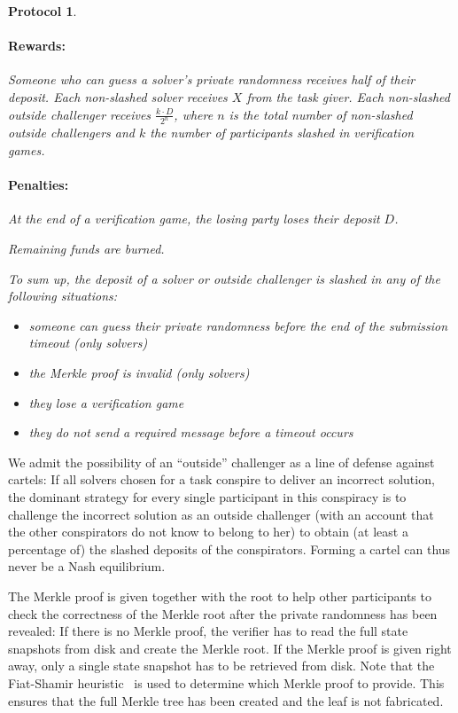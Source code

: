 \documentclass[a4paper]{article}
\newtheorem{protocol}[dummy]{Protocol}
\begin{document}
\begin{protocol}
\paragraph{Rewards:}
Someone who can guess a solver's private randomness receives half of their deposit.
Each non-slashed solver receives $X$ from the task giver.
Each non-slashed outside challenger receives $\frac{k\cdot D}{2^n}$, where
$n$ is the total number of non-slashed outside challengers and $k$ the number of
participants slashed in verification games.

\paragraph{Penalties:}
At the end of a verification game, the losing party loses their deposit $D$.

Remaining funds are burned.

To sum up, the deposit of a solver or outside challenger is slashed in any of the following situations:
\begin{itemize}
\item someone can guess their private randomness before the end of the submission timeout (only solvers)
\item the Merkle proof is invalid (only solvers)
\item they lose a verification game
\item they do not send a required message before a timeout occurs
\end{itemize}
\end{protocol}

We admit the possibility of an ``outside'' challenger
as a line of defense against cartels: If all solvers chosen for a task
conspire to deliver an incorrect solution, the dominant strategy for every single
participant in this conspiracy is to challenge the incorrect solution as an
outside challenger (with an account that the other conspirators do not know to
belong to her) to obtain (at least a percentage of) the slashed deposits of the
conspirators. Forming a cartel can thus never be a Nash equilibrium. 

The Merkle proof is given together with the root to help
other participants to check the correctness of the Merkle root after the private
randomness has been revealed:
If there is no Merkle proof, the verifier has to read the full state snapshots from disk and
create the Merkle root. If the Merkle proof is given right away, only a single
state snapshot has to be retrieved from disk.
Note that the Fiat-Shamir heuristic~\cite{FiatShamir} is used to determine
which Merkle proof to provide. This ensures that the full Merkle tree has been
created and the leaf is not fabricated.
\end{document}
